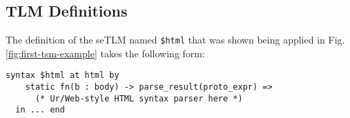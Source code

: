 \documentclass[acmsmall,10pt,review,anonymous]{acmart}\settopmatter{printfolios=true}
\newcommand{\li}[1]{\lstinline{#1}}
\begin{document}



\subsection{TLM Definitions}\label{sec:uetsms-definition}
The definition of the seTLM named \lstinline{$html} that was shown being applied in Fig. \ref{fig:first-tsm-example} takes the following form:
\begin{lstlisting}[mathescape=|]
  syntax $html at html by 
    static fn(b : body) -> parse_result(proto_expr) => 
      (* Ur/Web-style HTML syntax parser here *)
  in ... end 
\end{lstlisting}
\end{document}
